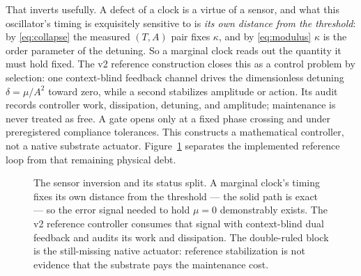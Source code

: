 \documentclass[11pt,a4paper]{article}
\newcommand{\figsub}{\scriptsize}
\theoremstyle{definition}
\theoremstyle{plain}
\theoremstyle{remark}
\begin{document}
That inverts usefully. A defect of a clock is a virtue of a sensor, and
what this oscillator's timing is exquisitely sensitive to is
\emph{its own distance from the threshold}: by \eqref{eq:collapse} the
measured $(T,A)$ pair fixes $\kappa$, and by \eqref{eq:modulus} $\kappa$
is the order parameter of the detuning. So a marginal clock reads out the quantity it must hold
fixed. The v2 reference construction closes this as a control problem by
selection: one context-blind feedback channel drives the dimensionless
detuning $\delta=\mu/A^2$ toward zero, while a second stabilizes amplitude
or action. Its audit records controller work, dissipation, detuning, and
amplitude; maintenance is never treated as free. A gate opens only at a
fixed phase crossing and under preregistered compliance tolerances. This
constructs a mathematical controller, not a native substrate actuator.
Figure~\ref{fig:sensorloop} separates the implemented reference loop from
that remaining physical debt.

\begin{figure}[t]
\centering
{}
\caption{The sensor inversion and its status split. A marginal clock's
timing fixes its own distance from the threshold --- the solid path is
exact --- so the error signal needed to hold $\mu=0$ demonstrably exists.
The v2 reference controller consumes that signal with context-blind dual
feedback and audits its work and dissipation. The double-ruled block is the
still-missing native actuator: reference stabilization is not evidence that
the substrate pays the maintenance cost.}
\label{fig:sensorloop}
\end{figure}
\end{document}
